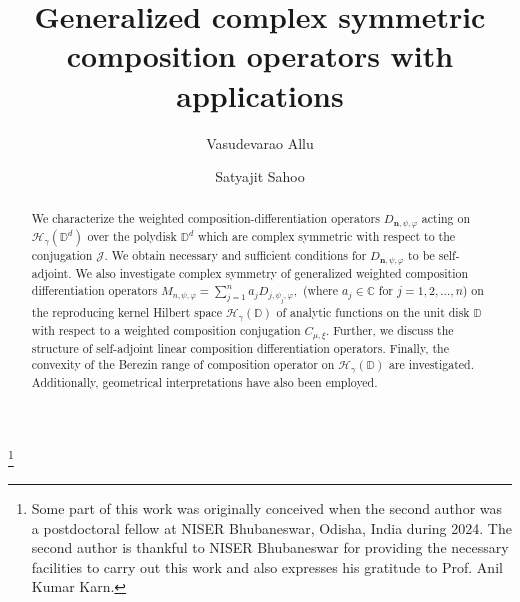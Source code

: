 \documentclass[12pt, reqno]{amsart}
\theoremstyle{definition}
\theoremstyle{remark}
\numberwithin{equation}{section}
\newcommand{\mfn}{\mathbf n}
\begin{document}
\title[Generalized composition operator] {{ Generalized complex symmetric composition operators with applications }}
\author[V. Allu] {Vasudevarao Allu}
\author[S. Sahoo] {Satyajit Sahoo}

\address{Vasudevarao Allu, Department of Mathematics, 
	School of Basic Sciences, Indian Institute of Technology Bhubaneswar, Odisha 752050, India.}

\address{Satyajit Sahoo, Department of Mathematics, 
	School of Basic Sciences, Indian Institute of Technology Bhubaneswar, Odisha 752050, India.}

\thanks{
Some part of this work was originally conceived when the second author was a postdoctoral fellow at NISER Bhubaneswar, Odisha, India during 2024. The second author is thankful to NISER Bhubaneswar for providing the necessary facilities to carry out this work and also expresses his gratitude to Prof. Anil Kumar Karn.
}



\date{}
\maketitle
\begin{abstract}
	
We characterize the weighted composition-differentiation operators $D_{\mfn,\psi,\varphi}$ acting on $\mathcal{H}_\gamma(\mathbb{D}^d)$ over the polydisk $\mathbb{D}^d$ which are complex symmetric with respect to the conjugation $\mathcal{J}$.
	We obtain necessary and sufficient conditions for $D_{\mfn,\psi,\varphi}$ to be self-adjoint. We also investigate complex symmetry of generalized weighted composition differentiation  operators $M_{n, \psi, \varphi}=\displaystyle\sum_{j=1}^{n}a_jD_{j,\psi_j, \varphi},$
(where $a_j\in \mathbb{C}$ for $j=1, 2, \dots, n$) on the reproducing kernel Hilbert space $\mathcal{H}_\gamma(\mathbb{D})$ of analytic functions on the unit disk $\mathbb{D}$ with respect to a weighted composition conjugation $C_{\mu, \xi}$. Further, we discuss the structure of self-adjoint linear composition differentiation operators. Finally, the convexity of the Berezin range of composition operator on $\mathcal{H}_\gamma(\mathbb{D})$ are investigated. Additionally, geometrical interpretations have also been employed.
\end{abstract}
\end{document}
